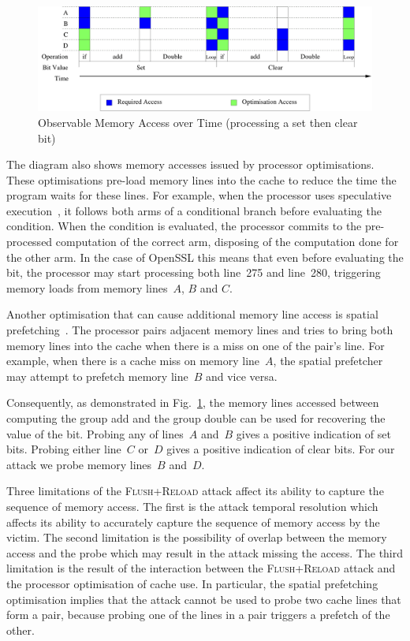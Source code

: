 \documentclass[twocolumn]{svjour3}
\begin{document}
\begin{figure}[htb]
\centering\includegraphics[width=\columnwidth]{images/temporal}
\caption{Observable Memory Access over Time (processing a set then clear bit)\label{dgm:temporal}}
\end{figure}

The diagram also shows memory accesses issued by processor optimisations.
These optimisations pre-load memory lines into the cache to reduce the time the program waits for these lines.
For example, when the processor uses speculative execution~\cite{uht95disjoint}, it follows both arms of a conditional
branch before evaluating the condition.
When the condition is evaluated, the processor commits to the pre-processed computation of the correct arm,
disposing of the computation done for the other arm. 
In the case of OpenSSL this means that even before evaluating the bit, 
the processor may start processing both line~275 and line~280, triggering memory loads from memory lines~$A$, $B$ and $C$.

Another optimisation that can cause additional memory line access is spatial prefetching~\cite{intel12optimization}.
The processor pairs adjacent memory lines and tries to bring both memory lines into the cache
when there is a miss on one of the pair's line.
For example, when there is a cache miss on memory line~$A$, the spatial prefetcher may attempt to prefetch memory line~$B$
and vice versa.

Consequently, as demonstrated in Fig.~\ref{dgm:temporal}, the memory lines accessed between computing
the group add and the group double can be used for recovering the value of the bit.
Probing any of lines~$A$ and~$B$ gives a positive indication of set bits.  
Probing either line~$C$ or~$D$ gives a positive indication of clear bits.
For our attack we probe memory lines~$B$ and~$D$.

Three limitations of the \textsc{Flush+Reload} attack affect its ability to capture the sequence of memory access.
The first is the attack temporal resolution which affects its ability to accurately capture the sequence of memory access
by the victim.
The second limitation is the possibility of overlap between the memory access and the probe which may result
in the attack missing the access.
The third limitation is the result of the interaction between the \textsc{Flush+Reload} attack and the processor
optimisation of cache use.  
In particular, the spatial prefetching optimisation implies that the attack cannot be used to probe two cache lines that form a pair,
because probing one of the lines in a pair triggers a prefetch of the other.
\end{document}
